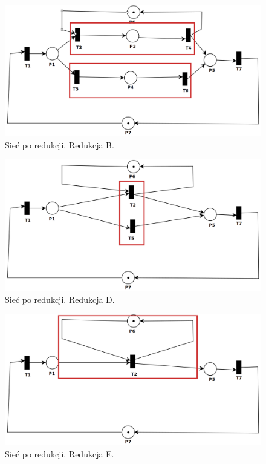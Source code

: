 \documentclass[12pt]{article}
\begin{document}
\begin{figure}[H]
    \centering
    \includegraphics[width=\linewidth]{../../lab8/ex_2_4}
    \caption{Sieć po redukcji. Redukcja B.}
\end{figure}

\begin{figure}[H]
    \centering
    \includegraphics[width=\linewidth]{../../lab8/ex_2_5}
    \caption{Sieć po redukcji. Redukcja D.}
\end{figure}

\begin{figure}[H]
    \centering
    \includegraphics[width=\linewidth]{../../lab8/ex_2_6}
    \caption{Sieć po redukcji. Redukcja E.}
\end{figure}
\end{document}

